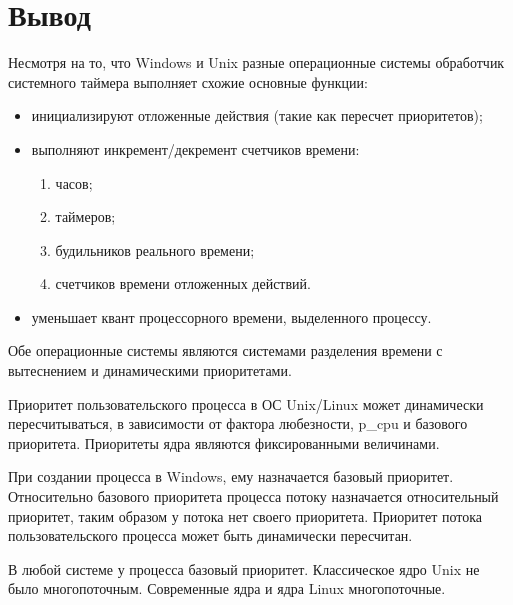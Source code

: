 \documentclass[a4paper,oneside,14pt]{extreport}
\begin{document}
\newpage

\section*{Вывод}

Несмотря на то, что Windows и Unix разные операционные системы
обработчик системного таймера выполняет
схожие основные функции:

\begin{itemize}
	\item инициализируют отложенные действия (такие как пересчет приоритетов);
	\item выполняют инкремент/декремент счетчиков времени:
	\begin{enumerate}
		\item часов;
		\item таймеров;
		\item будильников реального времени;
		\item счетчиков времени отложенных действий.
	\end{enumerate}
	\item уменьшает квант процессорного времени, выделенного процессу.
\end{itemize}

Обе операционные системы являются системами
разделения времени с вытеснением и динамическими приоритетами.

Приоритет пользовательского процесса в ОС Unix/Linux
может динамически пересчитываться, в зависимости от
фактора любезности, p\_cpu и базового приоритета. 
Приоритеты ядра являются фиксированными величинами.

При создании процесса в Windows, ему назначается базовый приоритет. 
Относительно базового приоритета процесса потоку назначается
относительный приоритет, таким образом у потока нет своего приоритета.
Приоритет потока пользовательского процесса может быть динамически пересчитан.

В любой системе у процесса базовый приоритет. 
Классическое ядро Unix не было многопоточным. 
Современные ядра и ядра Linux многопоточные.
\end{document}
